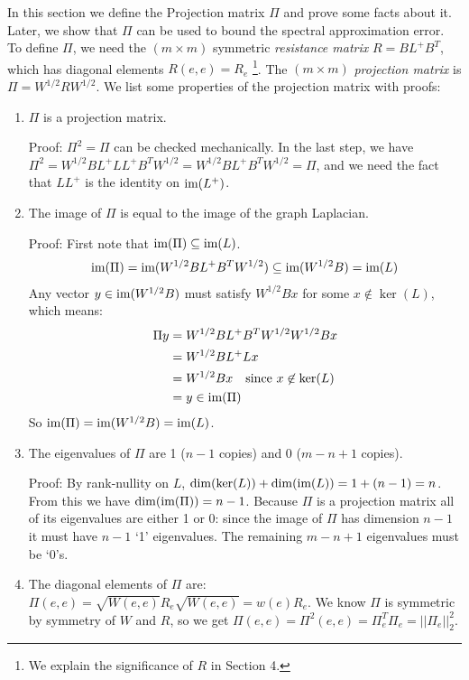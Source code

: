 \documentclass{article}
\begin{document}
In this section we define the Projection matrix $\Pi$ and prove some facts
about it. Later, we show that $\Pi$ can be used to bound the spectral
approximation error.  To define $\Pi$, we need the $(m \times m)$ symmetric
\textit{resistance matrix} $R = BL^+B^T$, which has diagonal elements $R(e,
e) = R_e$ \footnote{We explain the significance of $R$ in Section 4.}.  The
$(m \times m)$ \textit{projection matrix} is $\Pi = W^{1/2}RW^{1/2}$. We
list some properties of the projection matrix with proofs:
\begin{enumerate}[1.]
    \item $\Pi$ is a projection matrix.
        
        Proof: $\Pi^2 = \Pi$ can be checked mechanically. In the last step,
        we have $\Pi^2 = W^{1/2}BL^+LL^+B^TW^{1/2} = W^{1/2}BL^+B^TW^{1/2} =
        \Pi$, and we need the fact that $LL^+$ is the identity on
        $\text{im}(L^+)$.

    \item The image of $\Pi$ is equal to the image of the graph Laplacian.
        
        Proof: First note that $\text{im}(\Pi) \subseteq \text{im}(L)$.
        \begin{align*}
            \text{im}(\Pi) = \text{im}(W^{1/2}BL^+B^TW^{1/2}) \subseteq \text{im}(W^{1/2}B) =
            \text{im}(L)
        \end{align*}
        Any vector $y \in \text{im}(W^{1/2}B)$ must satisfy $W^{1/2}Bx$ for some
        $x \not\in \ker(L)$, which means:
        \begin{align*}
            \Pi y &= W^{1/2}BL^+B^TW^{1/2}W^{1/2}Bx \\
                  &= W^{1/2}BL^+Lx \\
                  &= W^{1/2}Bx \quad \text{since } x \not\in \ker(L) \\
                  &= y \in \text{im}(\Pi)
        \end{align*}
        So $\text{im}(\Pi) = \text{im}(W^{1/2}B) = \text{im}(L)$.

    \item The eigenvalues of $\Pi$ are 1 ($n-1$ copies) and 0 ($m-n+1$
        copies).

        Proof: By rank-nullity on $L$, $\dim(\ker(L)) + \dim(\text{im}(L)) = 1 +
        (n-1) = n$. From this we have $\dim(\text{im}(\Pi)) = n-1$. Because $\Pi$
        is a projection matrix all of its eigenvalues are either 1 or 0:
        since the image of $\Pi$ has dimension $n-1$ it must have $n-1$ `1'
        eigenvalues. The remaining $m-n+1$ eigenvalues must be `0's.

    \item The diagonal elements of $\Pi$ are: $\Pi(e, e) = \sqrt{W(e,
        e)}R_e\sqrt{W(e, e)} = w(e)R_e$. We know $\Pi$ is symmetric by
        symmetry of $W$ and $R$, so we get $\Pi(e, e) = \Pi^2(e, e) =
        \Pi_e^T\Pi_e = ||\Pi_e||^2_2$.
\end{enumerate}
\end{document}
